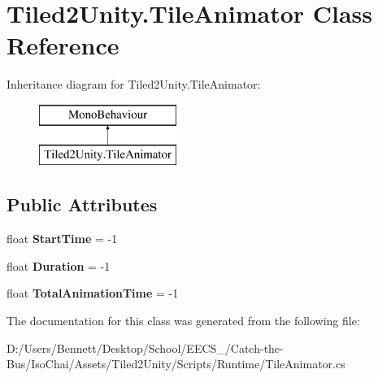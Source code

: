 \hypertarget{class_tiled2_unity_1_1_tile_animator}{}\section{Tiled2\+Unity.\+Tile\+Animator Class Reference}
\label{class_tiled2_unity_1_1_tile_animator}
Inheritance diagram for Tiled2\+Unity.\+Tile\+Animator\+:\begin{figure}[H]
\begin{center}
\leavevmode
\includegraphics[height=2.000000cm]{class_tiled2_unity_1_1_tile_animator}
\end{center}
\end{figure}
\subsection*{Public Attributes}
\begin{DoxyCompactItemize}
\item 
\mbox{\label{class_tiled2_unity_1_1_tile_animator_ac96cabb3b772e367d4141dba085a459b}} 
float {\bfseries Start\+Time} = -\/1
\item 
\mbox{\label{class_tiled2_unity_1_1_tile_animator_a36a9be6b0075d46cd283eba6ed110f02}} 
float {\bfseries Duration} = -\/1
\item 
\mbox{\label{class_tiled2_unity_1_1_tile_animator_abfc3c29538506faf9f4f8ef8bd438839}} 
float {\bfseries Total\+Animation\+Time} = -\/1
\end{DoxyCompactItemize}


The documentation for this class was generated from the following file\+:\begin{DoxyCompactItemize}
\item 
D\+:/\+Users/\+Bennett/\+Desktop/\+School/\+E\+E\+C\+S\+\_/\+Catch-\/the-\/\+Bus/\+Iso\+Chai/\+Assets/\+Tiled2\+Unity/\+Scripts/\+Runtime/Tile\+Animator.\+cs\end{DoxyCompactItemize}

